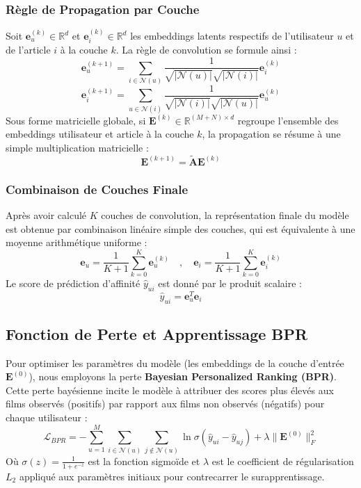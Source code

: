 \documentclass[12pt,a4paper]{article}
\begin{document}
\subsubsection{Règle de Propagation par Couche}
Soit $\mathbf{e}_u^{(k)} \in \mathbb{R}^d$ et $\mathbf{e}_i^{(k)} \in \mathbb{R}^d$ les embeddings latents respectifs de l'utilisateur $u$ et de l'article $i$ à la couche $k$. La règle de convolution se formule ainsi :
\begin{equation}
    \mathbf{e}_u^{(k+1)} = \sum_{i \in \mathcal{N}(u)} \frac{1}{\sqrt{|\mathcal{N}(u)|} \sqrt{|\mathcal{N}(i)|}} \mathbf{e}_i^{(k)}
\end{equation}
\begin{equation}
    \mathbf{e}_i^{(k+1)} = \sum_{u \in \mathcal{N}(i)} \frac{1}{\sqrt{|\mathcal{N}(i)|} \sqrt{|\mathcal{N}(u)|}} \mathbf{e}_u^{(k)}
\end{equation}
Sous forme matricielle globale, si $\mathbf{E}^{(k)} \in \mathbb{R}^{(M+N) \times d}$ regroupe l'ensemble des embeddings utilisateur et article à la couche $k$, la propagation se résume à une simple multiplication matricielle :
\begin{equation}
    \mathbf{E}^{(k+1)} = \tilde{\mathbf{A}} \mathbf{E}^{(k)}
\end{equation}

\subsubsection{Combinaison de Couches Finale}
Après avoir calculé $K$ couches de convolution, la représentation finale du modèle est obtenue par combinaison linéaire simple des couches, qui est équivalente à une moyenne arithmétique uniforme :
\begin{equation}
    \mathbf{e}_u = \frac{1}{K+1} \sum_{k=0}^{K} \mathbf{e}_u^{(k)} \quad , \quad \mathbf{e}_i = \frac{1}{K+1} \sum_{k=0}^{K} \mathbf{e}_i^{(k)}
\end{equation}
Le score de prédiction d'affinité $\hat{y}_{ui}$ est donné par le produit scalaire :
\begin{equation}
    \hat{y}_{ui} = \mathbf{e}_u^T \mathbf{e}_i
\end{equation}

\subsection{Fonction de Perte et Apprentissage BPR}
Pour optimiser les paramètres du modèle (les embeddings de la couche d'entrée $\mathbf{E}^{(0)}$), nous employons la perte \textbf{Bayesian Personalized Ranking (BPR)}. Cette perte bayésienne incite le modèle à attribuer des scores plus élevés aux films observés (positifs) par rapport aux films non observés (négatifs) pour chaque utilisateur :
\begin{equation}
    \mathcal{L}_{BPR} = -\sum_{u=1}^{M} \sum_{i \in \mathcal{N}(u)} \sum_{j \notin \mathcal{N}(u)} \ln \sigma \left( \hat{y}_{ui} - \hat{y}_{uj} \right) + \lambda \|\mathbf{E}^{(0)}\|_F^2
\end{equation}
Où $\sigma(z) = \frac{1}{1 + e^{-z}}$ est la fonction sigmoïde et $\lambda$ est le coefficient de régularisation $L_2$ appliqué aux paramètres initiaux pour contrecarrer le surapprentissage.
\end{document}
